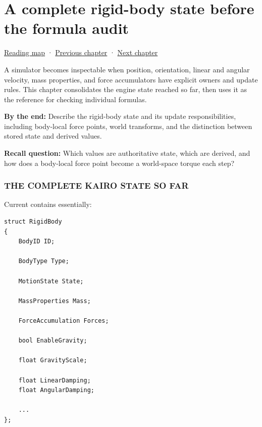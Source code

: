 \chapter{A complete rigid-body state before the formula audit}\label{06-engine-ii-ch035-a-complete-rigid-body-state-before-the-formula-audit}\hypertarget{06-engine-ii-ch035}{}\label{stagechapter:06-engine-ii-ch035}

\hypertarget{06-engine-ii-ch035-a-complete-rigid-body-state-before-the-formula-audit}{}

\hyperref[volume-reading-map]{Reading map} · \hyperref[06-engine-ii-ch034-rigid-body-motion-from-forces-to-contact]{Previous chapter} · \hyperref[06-engine-ii-ch036-auditing-capsule-mass-properties-and-collision-formulas]{Next chapter}

A simulator becomes inspectable when position, orientation, linear and angular velocity, mass properties, and force accumulators have explicit owners and update rules. This chapter consolidates the engine state reached so far, then uses it as the reference for checking individual formulas.

\textbf{By the end:} Describe the rigid-body state and its update responsibilities, including body-local force points, world transforms, and the distinction between stored state and derived values.

\textbf{Recall question:} Which values are authoritative state, which are derived, and how does a body-local force point become a world-space torque each step?

\subsection{THE COMPLETE KAIRO STATE SO FAR}\label{06-engine-ii-ch035-the-complete-kairo-state-so-far}

\hypertarget{06-engine-ii-ch035-the-complete-kairo-state-so-far}{}

Current  contains essentially:

\begin{verbatim}
struct RigidBody
{
    BodyID ID;

    BodyType Type;

    MotionState State;

    MassProperties Mass;

    ForceAccumulation Forces;

    bool EnableGravity;

    float GravityScale;

    float LinearDamping;
    float AngularDamping;

    ...
};
\end{verbatim}

